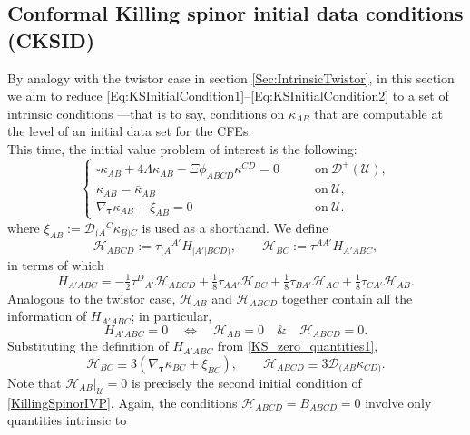 \documentclass[10pt,a4paper]{article}
\theoremstyle{plain}
\begin{document}
\subsection{Conformal Killing spinor initial data conditions (CKSID)}
\label{IntrinsicCKSID}

By analogy with the twistor case in section
\ref{Sec:IntrinsicTwistor}, in this section we aim to reduce
\eqref{Eq:KSInitialCondition1}--\eqref{Eq:KSInitialCondition2} to a
set of intrinsic conditions ---that is to say, conditions on
$\kappa_{AB}$ that are computable at the level of an initial data set
for the CFEs.  \\

This time, the initial value problem of interest is the following:
\begin{equation}\label{KillingSpinorIVP}
    \left\{
\begin{array}{ll}
	 \square \kappa_{AB} + 4 \Lambda\kappa_{AB} - \Xi
         \phi_{ABCD}\kappa^{CD} = 0 & \qquad
         \text{on}~\mathcal{D}^{+}(\mathcal{U}),\\ \kappa_{AB} =
         \bar{\kappa}_{AB}
         &\qquad\text{on}~\mathcal{U},\\ \nabla_{\bm\tau} \kappa_{AB}
         + \xi_{AB} = 0 &\qquad\text{on}~\mathcal{U}.
\end{array} \right.
\end{equation}
where $\xi_{AB}:=\mathcal{D}_{(A}{}^C\kappa_{B)C}$ is used as a
shorthand.  We define
\[\mathcal{H}_{ABCD}:=\tau_{(A}{}^{A'}H_{\vert A'\vert BCD)}, \qquad \mathcal{H}_{BC}:=\tau^{AA'}H_{A'ABC}, \]
in terms of which
\[H_{A'ABC} = -\tfrac{1}{2}\tau^D{}_{A'}\mathcal{H}_{ABCD} +
\tfrac{1}{8}\tau_{AA'}\mathcal{H}_{BC} + \tfrac{1}{8}\tau_{BA'}\mathcal{H}_{AC}
+ \tfrac{1}{8}\tau_{CA'}\mathcal{H}_{AB}. \]
Analogous to the twistor case, $\mathcal{H}_{AB}$ and
$\mathcal{H}_{ABCD}$ together contain all the information of
$H_{A'ABC}$; in particular,
\[
H_{A'ABC}=0 \quad \iff \quad \mathcal{H} _{AB}=0 \quad \& \quad
\mathcal{H}_{ABCD}=0.
\]
Substituting the definition of $H_{A'ABC}$ from
\eqref{KS_zero_quantities1},
\begin{equation}
\mathcal{H}_{BC}\equiv 3(\nabla_{\bm\tau} \kappa_{BC} + \xi_{BC}),
\qquad \mathcal{H}_{ABCD} \equiv
3\mathcal{D}_{(AB}\kappa_{CD)}. \label{Eq:SpatialKS}
\end{equation}
Note that $\mathcal{H}_{AB}|_{\mathcal{U}}=0$ is precisely the second
initial condition of \eqref{KillingSpinorIVP}. Again, the conditions
$\mathcal{H}_{ABCD}=B_{ABCD}=0$ involve only quantities intrinsic to
\end{document}
